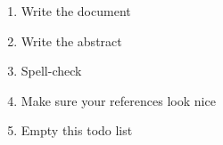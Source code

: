 \begin{enumerate}
\item Write the document
\item Write the abstract
\item Spell-check
\item Make sure your references look nice
\item Empty this todo list
\end{enumerate}
